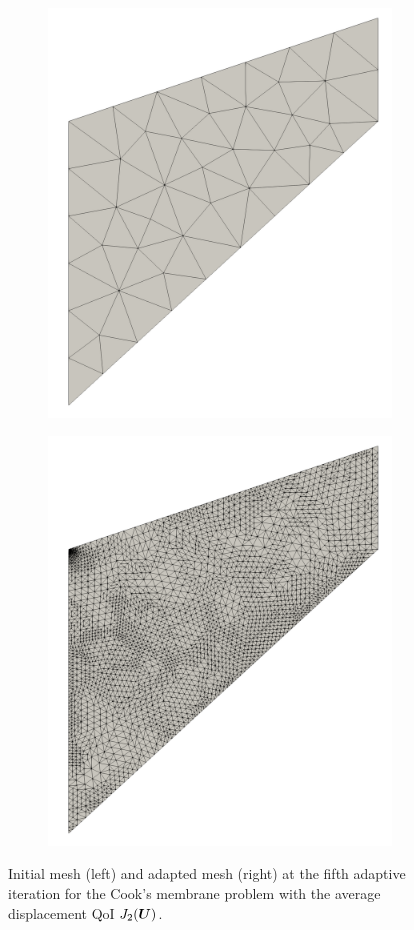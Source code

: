 \begin{figure}[ht!]
\centering
\begin{subfigure}{.5\textwidth}
\centering
\includegraphics[width=.6\linewidth]{img/mech_cooks_avg_u_initial_mesh.png}
\end{subfigure}%
\begin{subfigure}{.5\textwidth}
\centering
\includegraphics[width=.6\linewidth]{img/mech_cooks_avg_u_final_mesh.png}
\end{subfigure}
\caption{Initial mesh (left) and adapted mesh (right) at the fifth adaptive
iteration for the Cook's membrane problem with the average displacement
QoI $J_2(\boldsymbol{U})$.}
\label{fig:mech_cooks_avg_u_meshes}
\end{figure}

